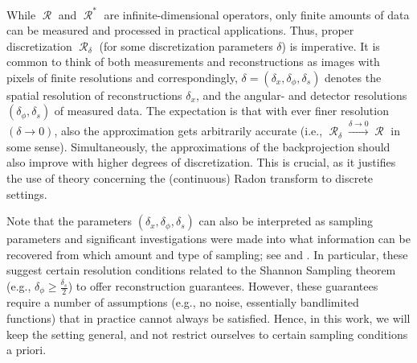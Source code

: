 \documentclass[11pt,reqno]{amsart}
\DeclareMathOperator{\Radon}{\mathcal{R}}
\numberwithin{theorem}{section}
\theoremstyle{remark}
\begin{document}
While $\Radon$ and $\Radon^*$ are infinite-dimensional operators, only finite amounts of data can be measured and processed in practical applications. Thus, proper discretization $\Radon_\delta$ (for some discretization parameters $\delta$) is imperative. It is common to think of both measurements and reconstructions as images with pixels of finite resolutions and correspondingly, $\delta=(\delta_x,\delta_\phi,\delta_s)$ denotes the spatial resolution of reconstructions $\delta_x$, and the angular- and detector resolutions $(\delta_\phi,\delta_s)$ of measured data.
 The expectation is that with ever finer resolution $(\delta\to 0)$, also the approximation gets arbitrarily accurate (i.e., $\Radon_\delta \overset{\delta \to 0}{\to} \Radon$ in some sense). Simultaneously, the approximations of the backprojection should also improve with higher degrees of discretization. This is crucial, as it justifies the use of theory concerning the (continuous) Radon transform to discrete settings.
 
Note that the parameters $(\delta_x,\delta_\phi,\delta_s)$ can also be interpreted as sampling parameters and  significant investigations were made into what information can be recovered from which amount and type of sampling; see \cite[Section III]{Natterer:2001:MCT:500773} and \cite{Faridani2004}. In particular, these suggest certain resolution conditions related to the Shannon Sampling theorem (e.g., $\delta_\phi \geq \frac {\delta_s}{2}$) to offer reconstruction guarantees. However, these guarantees require a number of assumptions (e.g., no noise, essentially bandlimited functions) that in practice cannot always be satisfied. Hence, in this work, we will keep the setting general, and not restrict ourselves to certain sampling conditions a priori.
\end{document}
